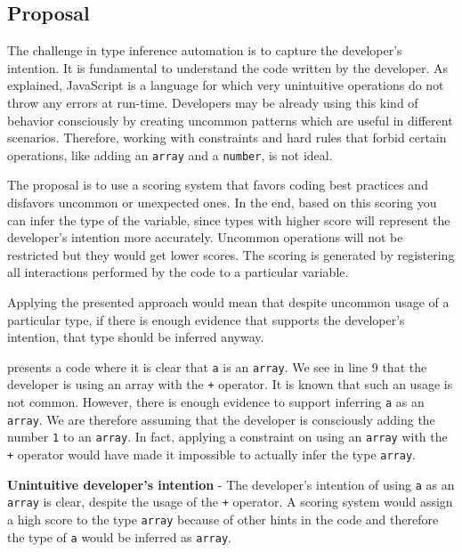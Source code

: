 \subsection{Proposal}
The challenge in type inference automation is to capture the developer's intention. It is fundamental to understand the code written by the developer. As explained, JavaScript is a language for which very unintuitive operations do not throw any errors at run-time. Developers may be already using this kind of behavior consciously by creating uncommon patterns which are useful in different scenarios. Therefore, working with constraints and hard rules that forbid certain operations, like adding an \texttt{array} and a \texttt{number}, is not ideal.

The proposal is to use a scoring system that favors coding best practices and disfavors uncommon or unexpected ones. In the end, based on this scoring you can infer the type of the variable, since types with higher score will represent the developer's intention more accurately. Uncommon operations will not be restricted but they would get lower scores. The scoring is generated by registering all interactions performed by the code to a particular variable.

Applying the presented approach would mean that despite uncommon usage of a particular type, if there is enough evidence that supports the developer's intention, that type should be inferred anyway.

 presents a code where it is clear that \texttt{a} is an \texttt{array}. We see in line 9 that the developer is using an array with the \texttt{+} operator. It is known that such an usage is not common. However, there is enough evidence to support inferring \texttt{a} as an \texttt{array}. We are therefore assuming that the developer is consciously adding the number \texttt{1} to an \texttt{array}. In fact, applying a constraint on using an \texttt{array} with the \texttt{+} operator would have made it impossible to actually infer the type \texttt{array}.

\begin{code}
  \captionsetup{aboveskip=0pt, belowskip=10pt}
  \caption[Unintuitive developer's intention]{\textbf{Unintuitive developer's intention} - The developer's intention of using \texttt{a} as an \texttt{array} is clear, despite the usage of the \texttt{+} operator. A scoring system would assign a high score to the type \texttt{array} because of other hints in the code and therefore the type of \texttt{a} would be inferred as \texttt{array}.}
  \label{code:type-inference-unintuitive-developers-intention}
\end{code}

